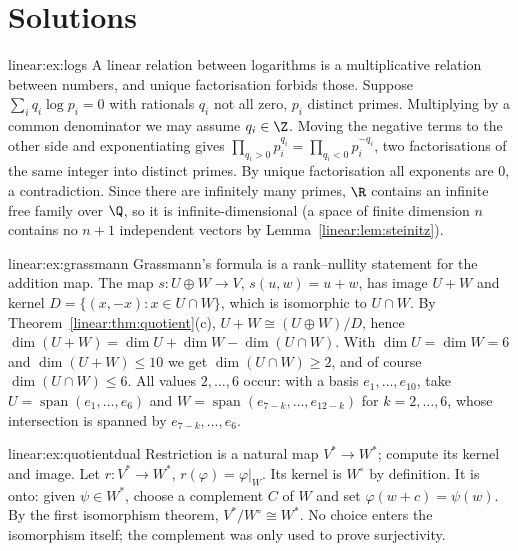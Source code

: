 \section{Solutions}

\begin{solution}{linear:ex:logs}
\idea A linear relation between logarithms is a multiplicative relation between numbers, and unique factorisation
forbids those.
\writeup Suppose $\sum_i q_i\log p_i=0$ with rationals $q_i$ not all zero, $p_i$ distinct primes. Multiplying by a common
denominator we may assume $q_i\in\Z$. Moving the negative terms to the other side and exponentiating gives
$\prod_{q_i>0}p_i^{q_i}=\prod_{q_i<0}p_i^{-q_i}$, two factorisations of the same integer into distinct primes. By unique
factorisation all exponents are $0$, a contradiction. Since there are infinitely many primes, $\R$ contains an infinite
free family over $\Q$, so it is infinite-dimensional (a space of finite dimension $n$ contains no $n+1$ independent
vectors by Lemma~\ref{linear:lem:steinitz}).
\end{solution}

\begin{solution}{linear:ex:grassmann}
\idea Grassmann's formula is a rank--nullity statement for the addition map.
\writeup The map $s:U\oplus W\to V$, $s(u,w)=u+w$, has image $U+W$ and kernel $D=\{(x,-x):x\in U\cap W\}$, which is
isomorphic to $U\cap W$. By Theorem~\ref{linear:thm:quotient}(c), $U+W\cong(U\oplus W)/D$, hence
$\dim(U+W)=\dim U+\dim W-\dim(U\cap W)$. With $\dim U=\dim W=6$ and $\dim(U+W)\le10$ we get $\dim(U\cap W)\ge2$, and of
course $\dim(U\cap W)\le6$. All values $2,\dots,6$ occur: with a basis $e_1,\dots,e_{10}$, take $U=\operatorname{span}(e_1,\dots,e_6)$
and $W=\operatorname{span}(e_{7-k},\dots,e_{12-k})$ for $k=2,\dots,6$, whose intersection is spanned by $e_{7-k},\dots,e_6$.
\end{solution}

\begin{solution}{linear:ex:quotientdual}
\idea Restriction is a natural map $V^*\to W^*$; compute its kernel and image.
\writeup Let $r:V^*\to W^*$, $r(\varphi)=\varphi|_W$. Its kernel is $W^\circ$ by definition. It is onto: given $\psi\in W^*$,
choose a complement $C$ of $W$ and set $\varphi(w+c)=\psi(w)$. By the first isomorphism theorem, $V^*/W^\circ\cong W^*$. No
choice enters the isomorphism itself; the complement was only used to prove surjectivity.
\end{solution}

